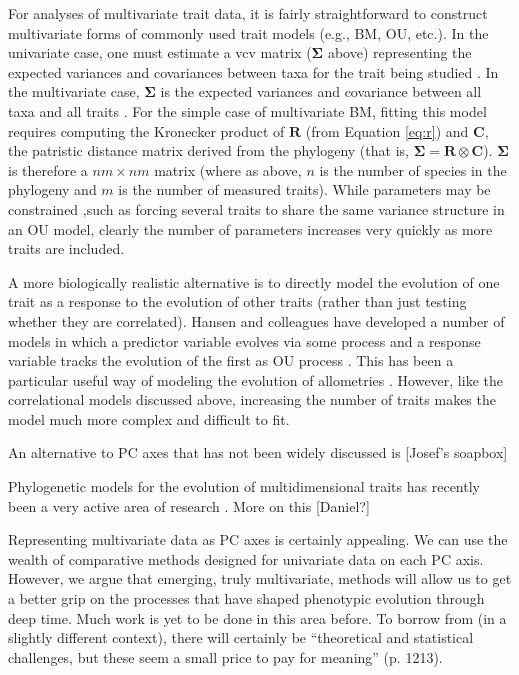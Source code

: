\documentclass[a4paper,12pt]{article}
\begin{document}
For analyses of multivariate trait data, it is fairly straightforward to construct multivariate forms of commonly used trait models (e.g., BM, OU, etc.). In the univariate case, one must estimate a vcv matrix ($\mathbf{\Sigma}$ above) representing the expected variances and covariances between taxa for the trait being studied \citep[see][for details]{Harmon2010, Omeara2012}. In the multivariate case, $\mathbf{\Sigma}$ is the expected variances and covariance between all taxa and all traits \citep{RevellHarmon2008, Hohenlohe2008, RevellCollar2009, ButlerKing2009, motmot}. For the simple case of multivariate BM, fitting this model requires computing the Kronecker product of $\mathbf{R}$ (from Equation \ref{eq:r}) and $\mathbf{C}$, the patristic distance matrix derived from the phylogeny (that is, $\mathbf{\Sigma} = \mathbf{R} \otimes \mathbf{C}$). $\mathbf{\Sigma}$ is therefore a $nm \times nm$ matrix (where as above, $n$ is the number of species in the phylogeny and $m$ is the number of measured traits). While parameters may be constrained ,such as forcing several traits to share the same variance structure in an OU model, clearly the number of parameters increases very quickly as more traits are included.

A more biologically realistic alternative is to directly model the evolution of one trait as a response to the evolution of other traits (rather than just testing whether they are correlated). Hansen and colleagues have developed a number of models in which a predictor variable evolves via some process and a response variable tracks the evolution of the first as OU process \citep{Hansen2008, Labra2009, Hansen2012SysBio, Bartoszek2012}. This has been a particular useful way of modeling the evolution of allometries \citep{Hansen2012SysBio, Voje2013, Voje2013b}. However, like the correlational models discussed above, increasing the number of traits makes the model much more complex and difficult to fit.

An alternative to PC axes that has not been widely discussed is [Josef's soapbox]

Phylogenetic models for the evolution of multidimensional traits has recently been a very active area of research \citep{Bookstein2012, Klingenberg2013, Monteiro2013, Adams2014, Adams2014b}. More on this [Daniel?]

Representing multivariate data as PC axes is certainly appealing. We can use the wealth of comparative methods designed for univariate data on each PC axis. However, we argue that emerging, truly multivariate, methods will allow us to get a better grip on the processes that have shaped phenotypic evolution through deep time. Much work is yet to be done in this area before. To borrow from \citet{HansenHoule2008} (in a slightly different context), there will certainly be ``theoretical and statistical challenges, but these seem a small price to pay for meaning'' (p. 1213).
\end{document}
